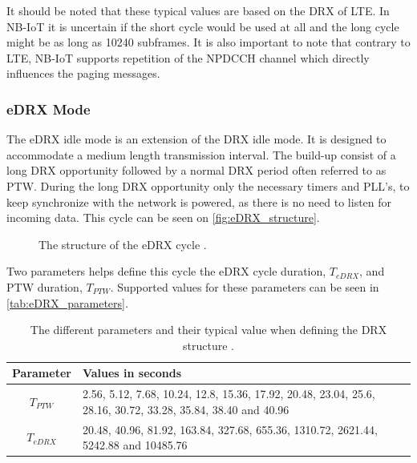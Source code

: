 It should be noted that these typical values are based on the DRX of LTE. In NB-IoT it is uncertain if the short cycle would be used at all and the long cycle might be as long as 10240 subframes. It is also important to note that contrary to LTE, NB-IoT supports repetition of the NPDCCH channel which directly influences the paging messages. \citep{NB-IoT_Book}


\subsubsection{eDRX Mode}
The eDRX idle mode is an extension of the DRX idle mode. It is designed to accommodate a medium length transmission interval. The build-up consist of a long DRX opportunity followed by a normal DRX period often referred to as \gls{PTW}. During the long DRX opportunity only the necessary timers and \gls{PLL}'s, to keep synchronize with the network is powered, as there is no need to listen for incoming data. This cycle can be seen on \autoref{fig:eDRX_structure}.

\begin{figure}[H]
\centering
\resizebox{\textwidth}{!}{
}
\caption{The structure of the \gls{eDRX} cycle \citep{NB-IoT_Book}.}
\label{fig:eDRX_structure}
\end{figure}

Two parameters helps define this cycle the eDRX cycle duration, $T_{eDRX}$, and \gls{PTW} duration, $T_{PTW}$. Supported values for these parameters can be seen in \autoref{tab:eDRX_parameters}.

\begin{table}[H]
\centering
\begin{tabular}{|c|p{8cm}|} \hline
\textbf{Parameter} & \textbf{Values in seconds} \\ \hline 
$T_{PTW}$ & 2.56, 5.12, 7.68, 10.24, 12.8, 15.36, 17.92, 20.48, 23.04, 25.6, 28.16, 30.72, 33.28, 35.84, 38.40 and 40.96\\ \hline
$T_{eDRX}$ & 20.48, 40.96, 81.92, 163.84, 327.68, 655.36, 1310.72, 2621.44, 5242.88 and 10485.76 \\ \hline
\end{tabular}
\caption{The different parameters and their typical value when defining the DRX structure \citep{book_LTE_for_UMTS}.}
\label{tab:eDRX_parameters}
\end{table}

